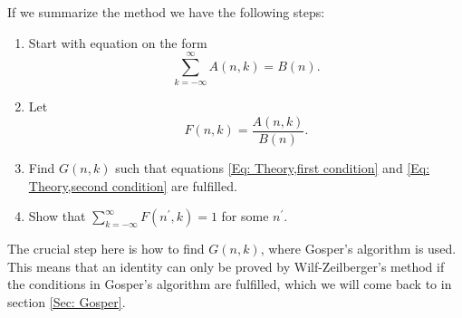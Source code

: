 If we summarize the method we have the following steps:
\begin{enumerate}
  \item Start with equation on the form $$\sum_{k=-\infty}^\infty A(n,k) = B(n).$$
  \item Let $$F(n,k)=\frac{A(n,k)}{B(n)}.$$
  \item Find $G(n,k)$ such that equations \eqref{Eq: Theory,first condition} and \eqref{Eq: Theory,second condition} are fulfilled.
  \item Show that $\sum_{k=-\infty}^\infty F(n^\prime,k)=1$ for some $n^\prime$.
\end{enumerate}
The crucial step here is how to find $G(n,k)$, where Gosper's algorithm is used. This means that an identity can only be proved by Wilf-Zeilberger's method if the conditions in Gosper's algorithm are fulfilled, which we will come back to in section \ref{Sec: Gosper}.

